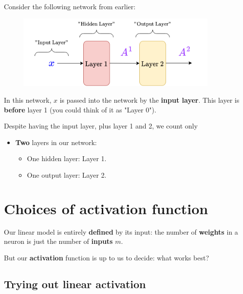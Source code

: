         \miniex Consider the following network from earlier:

        \begin{figure}[H]
            \centering
            \includegraphics[width=100mm,scale=0.4]{images/nn_images/two_layers_input_layer.png}
        \end{figure}

        In this network, $x$ is passed into the network by the \textbf{input layer}. This layer is \textbf{before} layer 1 (you could think of it as "Layer 0").

        Despite having the input layer, plus layer 1 and 2, we count only
        
        \begin{itemize}
            \item \textbf{Two} layers in our network:
            \begin{itemize}
                \item One hidden layer: Layer 1.
                \item One output layer: Layer 2. 
            \end{itemize}
        \end{itemize}

        

        
        
    
\pagebreak
\section{Choices of activation function}

    Our linear model is entirely \textbf{defined} by its input: the number of \textbf{weights} in a neuron is just the number of \textbf{inputs} $m$.
    
    But our \textbf{activation} function is up to us to decide: what works best?
    
    \subsection{Trying out linear activation}
        
